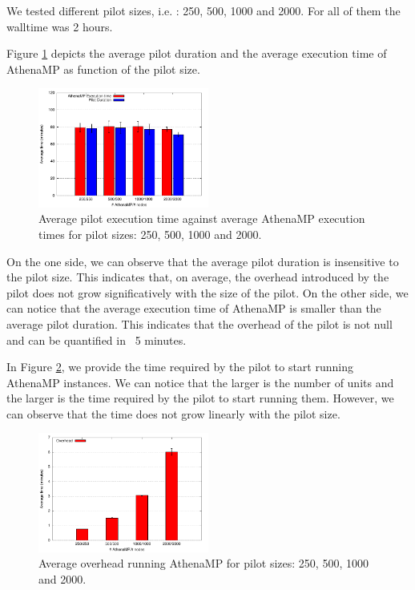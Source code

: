We tested different pilot sizes, i.e. : 250, 500, 1000 and 2000. For all of them the walltime was 2 hours.

Figure \ref{fig:weakScal1a} depicts the average pilot duration and the average execution time of AthenaMP as function of the pilot size.  

\begin{figure}[!htb]
        \includegraphics[width=0.5\textwidth]{./figures/NGE/weakET1.pdf}
    \caption{Average pilot execution time against average AthenaMP execution times for pilot sizes: 250, 500, 1000 and 2000.}
\label{fig:weakScal1a}
\end{figure}

On the one side, we can observe that the average pilot duration is insensitive to the pilot size. This indicates that, on average, the overhead introduced by the pilot does not grow significatively with the size of the pilot.
On the other side, we can notice that the average execution time of AthenaMP is smaller than the average pilot duration. This indicates that the overhead of the pilot is not null and can be quantified in ~5 minutes.  


In Figure \ref{fig:weakScal1b}, we provide the time required by the pilot to start running AthenaMP instances.  
We can notice that the larger is the number of units and the larger is the time required by the pilot to start running them. However, we can observe that the time does not grow linearly with the pilot size. 

\begin{figure}[!htb]
        \includegraphics[width=0.5\textwidth]{./figures/NGE/weakOver1.pdf}
    \caption{Average overhead running AthenaMP for pilot sizes: 250, 500, 1000 and 2000.}
\label{fig:weakScal1b}
\end{figure}


